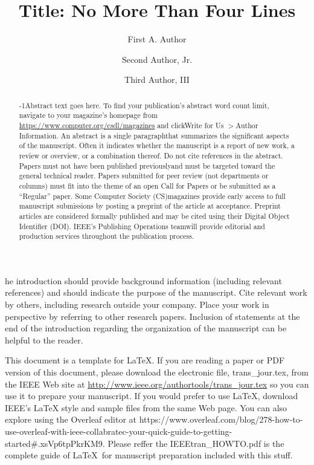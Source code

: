 \documentclass{IEEEcsmag}
\begin{document}

\title{Title: No More Than Four Lines}

\author{First A. Author}

\author{Second Author, Jr.}

\author{Third Author, III}


\begin{abstract}
\looseness-1Abstract text goes here. To find your publication's abstract word count limit, navigate to your magazine's homepage from \url{https://www.computer.org/csdl/magazines} and clickWrite for Us $>$Author Information. An abstract is a single paragraphthat summarizes the significant aspects of the manuscript. Often it indicates whether the manuscript is a report of new work, a review or overview, or a combination thereof. Do not cite references in the abstract. Papers must not have been published previouslyand must be targeted toward the general technical reader. Papers submitted for peer review (not departments or columns) must fit into the theme of an open Call for Papers or be submitted as a ``Regular'' paper. Some Computer Society (CS)magazines provide early access to full manuscript submissions by posting a preprint of the article at acceptance. Preprint articles are considered formally published and may be cited using their Digital Object Identifier (DOI). IEEE's Publishing Operations teamwill provide editorial and production services throughout the publication process.
\end{abstract}

\maketitle

he introduction should provide background information (including relevant references) and should indicate the purpose of the manuscript. Cite relevant work by others, including research outside your company. Place your work in perspective by referring to other research papers. Inclusion of statements at the end of the introduction regarding the organization of the manuscript can be helpful to the reader.


This document is a template for \LaTeX. If you are reading a paper or PDF version of this document, please download the electronic file, trans\_jour.tex, from the IEEE Web site at \url{http://www.ieee.org/authortools/trans_jour.tex} so you can use it to prepare your manuscript. If you would prefer to use LaTeX, download IEEE's LaTeX style and sample files from the same Web page. You can also explore using the Overleaf editor at {https://www.overleaf.com/blog/278-how-to-use-overleaf-with-ieee-collabratec-your-quick-guide-to-getting-started\#.xsVp6tpPkrKM9}. Please reffer the IEEEtran\_HOWTO.pdf is the complete guide of \LaTeX\ for manuscript preparation included with this stuff.
\end{document}
